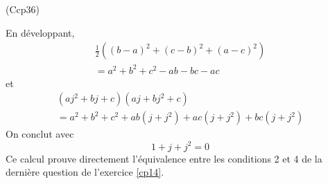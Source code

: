 \begin{tiny}(Ccp36)\end{tiny} En développant,
\begin{multline*}
  \frac{1}{2}\left( (b-a)^2+(c-b)^2+(a-c)^2\right)\\
  = a^2+b^2+c^2 -ab-bc-ac
\end{multline*} et
\begin{multline*}
  (aj^2+bj+c)(aj+bj^2+c)\\=
  a^2+b^2+c^2+ab(j+j^2)+ac(j+j^2)+bc(j+j^2)
\end{multline*}
On conclut avec
\begin{displaymath}
  1+j+j^2 = 0
\end{displaymath}
Ce calcul prouve directement l'équivalence entre les conditions 2 et 4 de la dernière question de l'exercice \ref{cp14}.